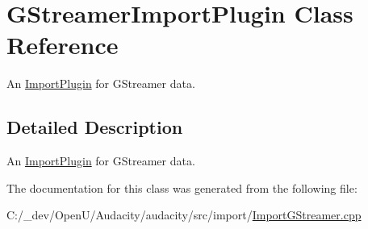 \hypertarget{class_g_streamer_import_plugin}{}\section{G\+Streamer\+Import\+Plugin Class Reference}
\label{class_g_streamer_import_plugin}


An \hyperlink{class_import_plugin}{Import\+Plugin} for G\+Streamer data.  




\subsection{Detailed Description}
An \hyperlink{class_import_plugin}{Import\+Plugin} for G\+Streamer data. 

The documentation for this class was generated from the following file\+:\begin{DoxyCompactItemize}
\item 
C\+:/\+\_\+dev/\+Open\+U/\+Audacity/audacity/src/import/\hyperlink{_import_g_streamer_8cpp}{Import\+G\+Streamer.\+cpp}\end{DoxyCompactItemize}
